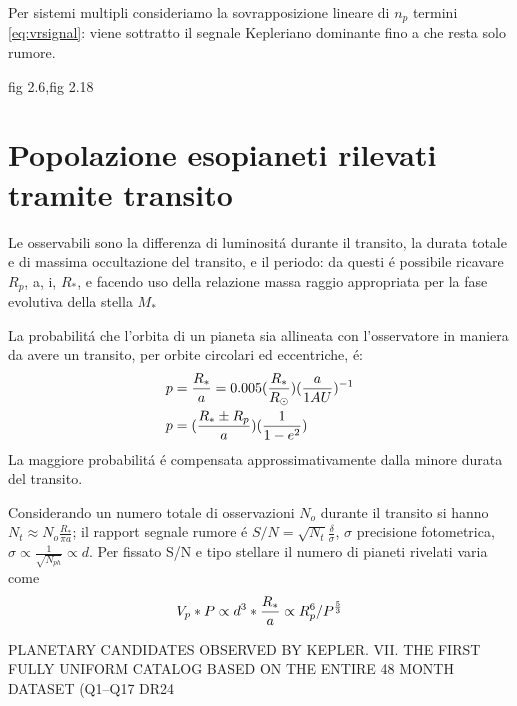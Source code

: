 Per sistemi multipli consideriamo la sovrapposizione lineare di $n_p$ termini \eqref{eq:vrsignal}: viene sottratto il segnale Kepleriano dominante fino a che resta solo rumore.

\begin{workout}
fig 2.6,fig 2.18
\end{workout}


\section{Popolazione esopianeti rilevati tramite transito}

Le osservabili sono la differenza di luminosit\'a durante il transito, la durata totale e di massima occultazione del transito, e il periodo: da questi \'e possibile ricavare $R_p$, a, i, $R_*$, e facendo uso della relazione massa raggio appropriata per la fase evolutiva della stella $M_*$

La probabilit\'a che l'orbita di un pianeta sia allineata con l'osservatore in maniera da avere un transito, per orbite circolari ed eccentriche, \'e:
\begin{align*}
&p=\frac{R_*}{a}=0.005(\frac{R_*}{R_{\odot}{}})(\frac{a}{1AU})^{-1}\\
&p=(\frac{R_*\pm R_p}{a})(\frac{1}{1-e^2})
\end{align*}
La maggiore probabilit\'a \'e compensata approssimativamente dalla minore durata del transito.

\begin{workout}
Considerando un numero totale di osservazioni $N_o$ durante il transito si hanno $N_t\approx N_o\frac{R_*}{\pi a}$; il rapport segnale rumore \'e $S/N=\sqrt{N_t}\frac{\delta}{\sigma}$, $\sigma$ precisione fotometrica, $\sigma\propto\frac{1}{\sqrt{N_{ph}}}\propto d$. Per fissato S/N e tipo stellare il numero di pianeti rivelati varia come
\begin{equation}
V_p*P\propto d^3*\frac{R_*}{a}\propto R_p^6/P^{\frac{5}{3}}
\end{equation}
\end{workout}


\begin{workout}
PLANETARY CANDIDATES OBSERVED BY KEPLER. VII. THE FIRST FULLY UNIFORM CATALOG BASED ON THE ENTIRE 48 MONTH DATASET (Q1–Q17 DR24
\end{workout}


